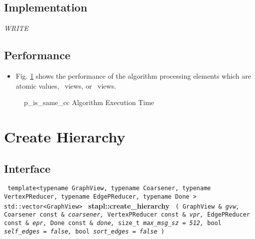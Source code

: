 \subsection{Implementation} \label{sec-p-is-same-cc-alg-impl}

\textit{WRITE}

\subsection{Performance} \label{sec-p-is-same-cc-alg-perf}

\begin{itemize}
\item
Fig. \ref{fig:p-is-same-cc-alg-exec-exper}
shows the performance of the algorithm processing
elements which are atomic values, \stl\ views, or \stapl\ views.
\end{itemize}

\begin{figure}[p]
\caption{p\_is\_same\_cc Algorithm Execution Time}
\label{fig:p-is-same-cc-alg-exec-exper}
\end{figure}


\section{ Create Hierarchy}
\label{sec-create-hier-alg}

\subsection{Interface} \label{sec-create-hier-alg-inter}

\noindent
\texttt{%
template<typename GraphView, typename Coarsener, 
\newline
typename VertexPReducer, typename EdgePReducer, typename Done >
\newline
std::vector<GraphView>
}
\newline
\textbf{stapl::create\_hierarchy}%
\newline
\texttt{%
(
GraphView \&
\textit{gvw,}%
Coarsener const \&
\textit{coarsener,}%
VertexPReducer const \&
\textit{vpr,}%
EdgePReducer const \&
\textit{epr,}%
Done const \&
\textit{done,}%
size\_t
\textit{max\_msg\_sz = 512,}%
bool
\textit{self\_edges = false,}%
bool
\textit{sort\_edges = false}%
)     
}
\vspace{0.4cm}

